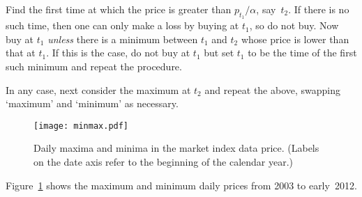 \documentclass[12pt, a4paper]{article}
\begin{document}
Find the first time at which the price is greater than
$p_{t_1}/\alpha$, say~$t_2$. If there is no such time, then one can
only make a loss by buying at $t_1$, so do not buy. Now buy at $t_1$
\emph{unless} there is a minimum between $t_1$ and $t_2$ whose price
is lower than that at $t_1$. If this is the case, do not buy at $t_1$
but set $t_1$ to be the time of the first such minimum and repeat the
procedure. 

In any case, next consider the maximum at $t_2$ and repeat the above,
swapping `maximum' and `minimum' as necessary.




 







\begin{figure}[htb]
\centering
\texttt{[image: minmax.pdf]}
\caption{Daily maxima and minima in the market index data
  price. (Labels on the date axis refer to the beginning of the
  calendar year.)}
\label{fig:minmax}
\end{figure}

Figure~\ref{fig:minmax} shows the maximum and minimum daily prices
from 2003 to early~2012. 
\end{document}
